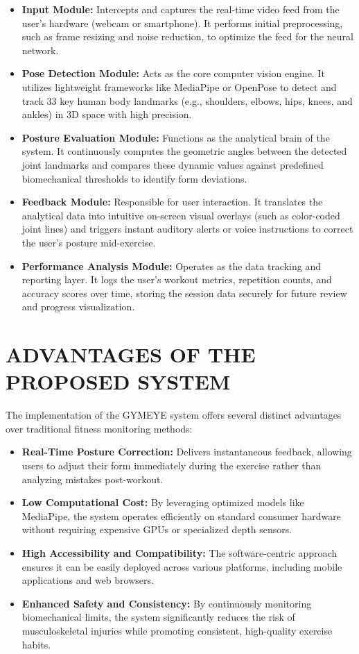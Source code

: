 \begin{itemize}
    \item \textbf{Input Module:} Intercepts and captures the real-time video feed from the user's hardware (webcam or smartphone). It performs initial preprocessing, such as frame resizing and noise reduction, to optimize the feed for the neural network.
    
    \item \textbf{Pose Detection Module:} Acts as the core computer vision engine. It utilizes lightweight frameworks like MediaPipe or OpenPose to detect and track 33 key human body landmarks (e.g., shoulders, elbows, hips, knees, and ankles) in 3D space with high precision.
    
    \item \textbf{Posture Evaluation Module:} Functions as the analytical brain of the system. It continuously computes the geometric angles between the detected joint landmarks and compares these dynamic values against predefined biomechanical thresholds to identify form deviations.
    
    \item \textbf{Feedback Module:} Responsible for user interaction. It translates the analytical data into intuitive on-screen visual overlays (such as color-coded joint lines) and triggers instant auditory alerts or voice instructions to correct the user's posture mid-exercise.
    
    \item \textbf{Performance Analysis Module:} Operates as the data tracking and reporting layer. It logs the user's workout metrics, repetition counts, and accuracy scores over time, storing the session data securely for future review and progress visualization.
\end{itemize}

\section{ADVANTAGES OF THE PROPOSED SYSTEM}
The implementation of the GYMEYE system offers several distinct advantages over traditional fitness monitoring methods:

\begin{itemize}
    \item \textbf{Real-Time Posture Correction:} Delivers instantaneous feedback, allowing users to adjust their form immediately during the exercise rather than analyzing mistakes post-workout.
    \item \textbf{Low Computational Cost:} By leveraging optimized models like MediaPipe, the system operates efficiently on standard consumer hardware without requiring expensive GPUs or specialized depth sensors.
    \item \textbf{High Accessibility and Compatibility:} The software-centric approach ensures it can be easily deployed across various platforms, including mobile applications and web browsers.
    \item \textbf{Enhanced Safety and Consistency:} By continuously monitoring biomechanical limits, the system significantly reduces the risk of musculoskeletal injuries while promoting consistent, high-quality exercise habits.
\end{itemize}